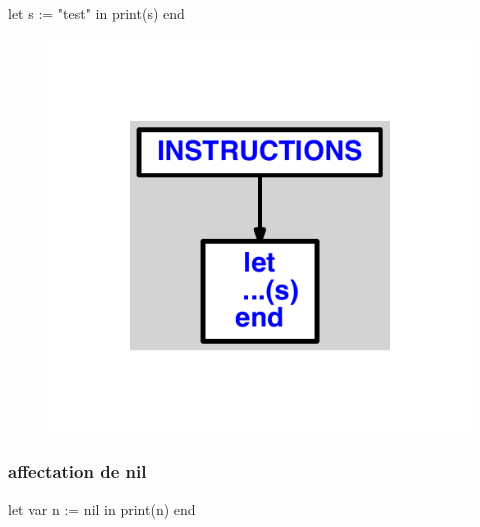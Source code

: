 \documentclass{article}
\begin{document}
\begin{verbatimtab}
let
	s := "test"
in
	print(s)
end
\end{verbatimtab}
\begin{figure}[H]\centering\includegraphics[max width=\textwidth]{ast/ast_283.pdf}\end{figure}\subsubsection{affectation de nil}
\begin{verbatimtab}
let
	var n := nil
in
	print(n)
end
\end{verbatimtab}
\end{document}
